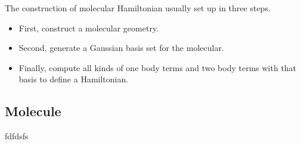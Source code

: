 \documentclass[letterpaper,10pt,english]{sphinxmanual}
\begin{document}
%
\begin{sphinxVerbatim}[commandchars=\\\{\}]
   \PYGZbs{} \PYGZbs{}\PYGZbs{}\PYGZbs{}  \PYGZbs{} \PYGZbs{}
\PYGZbs{}\PYGZbs{}\PYGZbs{}\PYGZbs{}\PYGZbs{}\PYGZbs{}
\end{sphinxVerbatim}

The construction of molecular Hamiltonian usually set up in three steps.
\begin{itemize}
\item {} 
First, construct a molecular geometry.

\item {} 
Second, generate a Gaussian basis set for the molecular.

\item {} 
Finally, compute all kinds of one body terms and two body terms with that basis
to define a Hamiltonian.

\end{itemize}


\subsection{Molecule}
\label{\detokenize{developer_derivation:molecule}}
fdfdsfs
\end{document}
